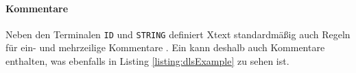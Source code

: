     

    \paragraph{Kommentare}
    Neben den Terminalen \texttt{ID} und \texttt{STRING} definiert Xtext standardmäßig auch Regeln für ein- und mehrzeilige Kommentare
    \cite[Kapitel "`Common Terminals"']{xtext:documentation}.
    Ein {\classificationModel} kann deshalb auch Kommentare enthalten,
    was ebenfalls in Listing \ref{listing:dlsExample} zu sehen ist.
